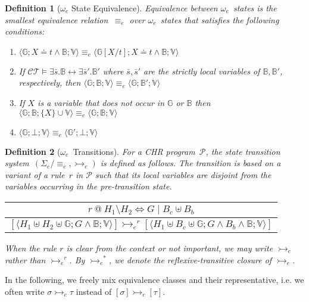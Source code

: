 \documentclass{tlp}
\newtheorem{definition}{Definition}[section]
\newcommand{\B}{\ensuremath{\mathbb{B}}}
\newcommand{\G}{\ensuremath{\mathbb{G}}}
\newcommand{\mcP}{\ensuremath{\mathcal{P}}}
\newcommand{\V}{\ensuremath{\mathbb{V}}}
\newcommand{\CT}{\ensuremath{\mathcal{CT}}}
\newcommand{\subxt}{\left[X/t\right] }
\newcommand{\Xet}{X\doteq t }
\def\tuple#1{\langle #1 \rangle}
\newcommand{\stesq}[3]{\ensuremath{\tuple{#1; #2; #3}}}
\newcommand{\oesq}{\ensuremath{{\omega_e}}}
\newcommand{\Sesq}{\ensuremath{{\Sigma_e}}}
\newcommand{\eesq}{\ensuremath{\equiv_e}}
\newcommand{\der}{\ensuremath{\rightarrowtail}}
\newcommand{\deresq}{\ensuremath{\der_e}}
\begin{document}
\begin{definition}[$\oesq$ State Equivalence]
\label{def:m:equiv}
Equivalence between \oesq~states is the smallest equivalence relation~$\eesq$
over \oesq~states that satisfies the following conditions:

\begin{enumerate}
\item \label{cond:m:subst}
$\stesq{\G}{\Xet\wedge\B}{\V} \eesq \stesq{\G\subxt}{\Xet\wedge\B}{\V}$
\item \label{cond:m:ct} If
$\CT\models\exists \bar s.\B \leftrightarrow\exists\bar s'.\B'$ where $\bar s,
\bar s'$ are the strictly local variables of $\B,\B'$, respectively, then $
\stesq{\G}{\B}{\V} \eesq \stesq{\G}{\B'}{\V}$
\item \label{cond:m:global} 
If $X$ is a variable that does not occur in $\G$ or $\B$ then
$\stesq{\G}{\B}{\{X\}\cup\V} \eesq \stesq{\G}{\B}{\V}$
\item \label{cond:m:fail}
$\stesq{\G}{\bot}{\V} \eesq \stesq{\G'}{\bot}{\V}$
\end{enumerate}
\end{definition}

\begin{definition}[\oesq~Transitions]
	\label{def:opsem_classes}
For a CHR program~$\mcP$, the state transition system~$(\Sesq/\!\!\eesq,\deresq)$
is defined as follows. The transition is based on a variant of a rule~$r$ in
$\mcP$ such that its local variables are disjoint from the variables occurring in
the pre-transition state.

\begin{center}
\begin{tabular*}{9.5cm}{c}
$r\ @\ H_1 \setminus H_2 \Leftrightarrow G\mid B_c \uplus B_b$ \\[-.05cm]
\hline
$[\stesq{H_1 \uplus H_2 \uplus \G}{G\wedge\B}{\V}]
	\deresq^r
[\stesq{H_1 \uplus B_c \uplus \G}{G\wedge B_b\wedge\B}{\V}]$
\end{tabular*}
\end{center}

When the rule $r$ is clear from the context or not important, we may write
$\deresq$ rather than $\deresq^r$. By $\deresq^*$, we denote the
reflexive-transitive closure of $\deresq$.
\end{definition}

In the following, we freely mix equivalence classes and their representative,
i.e. we often write $\sigma \deresq \tau$ instead of $[\sigma] \deresq [\tau]$.
\end{document}
